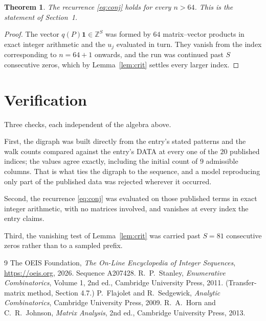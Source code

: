 \documentclass[11pt,a4paper]{article}
\theoremstyle{plain}
\newtheorem{theorem}{Theorem}
\theoremstyle{definition}
\begin{document}
\begin{theorem}
The recurrence \eqref{eq:conj} holds for every $n>64$. This is the statement of
Section~1.
\end{theorem}

\begin{proof}
The vector $q(P)\mathbf{1}\in\mathbb{Z}^{S}$ was formed by $64$ matrix--vector
products in exact integer arithmetic and the $u_j$ evaluated in turn. They vanish from the
index corresponding to $n=64+1$ onwards, and the run was continued past $S$ consecutive
zeros, which by Lemma~\ref{lem:crit} settles every larger index.
\end{proof}

\section{Verification}

Three checks, each independent of the algebra above.

First, the digraph was built directly from the entry's stated patterns and the walk counts
compared against the entry's DATA at every one of the $20$ published indices; the
values agree exactly, including the initial count of $9$ admissible columns. That is
what ties the digraph to the sequence, and a model reproducing only part of the published
data was rejected wherever it occurred.

Second, the recurrence \eqref{eq:conj} was evaluated on those published terms in exact
integer arithmetic, with no matrices involved, and vanishes at every index the entry claims.

Third, the vanishing test of Lemma~\ref{lem:crit} was carried past $S=81$ consecutive
zeros rather than to a sampled prefix.

\begin{thebibliography}{9}
 The OEIS Foundation, \emph{The On-Line Encyclopedia of Integer
Sequences}, \url{https://oeis.org}, 2026. Sequence A207428.
 R.~P.~Stanley, \emph{Enumerative Combinatorics}, Volume 1, 2nd ed.,
Cambridge University Press, 2011. (Transfer-matrix method, Section 4.7.)
 P.~Flajolet and R.~Sedgewick, \emph{Analytic Combinatorics}, Cambridge
University Press, 2009.
 R.~A.~Horn and C.~R.~Johnson, \emph{Matrix Analysis}, 2nd ed., Cambridge
University Press, 2013.
\end{thebibliography}
\end{document}
